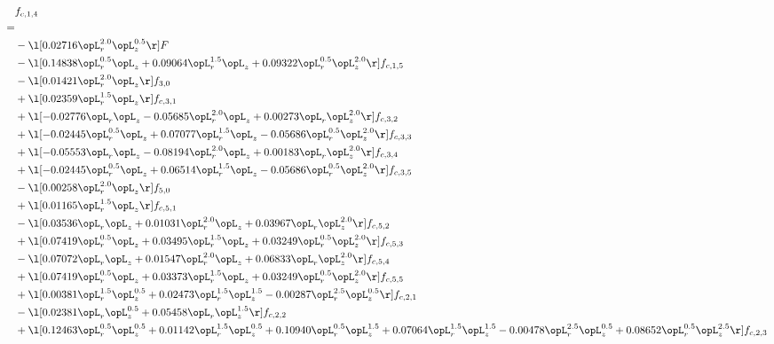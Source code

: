 \begin{alignat}{2} 
\label{eq:f_14_2} 
& f_{c,1,4} \nonumber \\ 
 = \\ 
& - \l[  0.02716 \opL_r^{2.0} \opL_z^{0.5}  \r] F \nonumber \\ 
& - \l[  0.14838 \opL_r^{0.5} \opL_z +  0.09064 \opL_r^{1.5} \opL_z +  0.09322 \opL_r^{0.5} \opL_z^{2.0}  \r] f_{c,1,5} \nonumber \\ 
& - \l[  0.01421 \opL_r^{2.0} \opL_z  \r] f_{3,0} \nonumber \\ 
& + \l[  0.02359 \opL_r^{1.5} \opL_z  \r] f_{c,3,1} \nonumber \\ 
& + \l[  -0.02776 \opL_r \opL_z   -0.05685 \opL_r^{2.0} \opL_z +  0.00273 \opL_r \opL_z^{2.0}  \r] f_{c,3,2} \nonumber \\ 
& + \l[  -0.02445 \opL_r^{0.5} \opL_z +  0.07077 \opL_r^{1.5} \opL_z   -0.05686 \opL_r^{0.5} \opL_z^{2.0}  \r] f_{c,3,3} \nonumber \\ 
& + \l[  -0.05553 \opL_r \opL_z   -0.08194 \opL_r^{2.0} \opL_z +  0.00183 \opL_r \opL_z^{2.0}  \r] f_{c,3,4} \nonumber \\ 
& + \l[  -0.02445 \opL_r^{0.5} \opL_z +  0.06514 \opL_r^{1.5} \opL_z   -0.05686 \opL_r^{0.5} \opL_z^{2.0}  \r] f_{c,3,5} \nonumber \\ 
& - \l[  0.00258 \opL_r^{2.0} \opL_z  \r] f_{5,0} \nonumber \\ 
& + \l[  0.01165 \opL_r^{1.5} \opL_z  \r] f_{c,5,1} \nonumber \\ 
& - \l[  0.03536 \opL_r \opL_z +  0.01031 \opL_r^{2.0} \opL_z +  0.03967 \opL_r \opL_z^{2.0}  \r] f_{c,5,2} \nonumber \\ 
& + \l[  0.07419 \opL_r^{0.5} \opL_z +  0.03495 \opL_r^{1.5} \opL_z +  0.03249 \opL_r^{0.5} \opL_z^{2.0}  \r] f_{c,5,3} \nonumber \\ 
& - \l[  0.07072 \opL_r \opL_z +  0.01547 \opL_r^{2.0} \opL_z +  0.06833 \opL_r \opL_z^{2.0}  \r] f_{c,5,4} \nonumber \\ 
& + \l[  0.07419 \opL_r^{0.5} \opL_z +  0.03373 \opL_r^{1.5} \opL_z +  0.03249 \opL_r^{0.5} \opL_z^{2.0}  \r] f_{c,5,5} \nonumber \\ 
& + \l[  0.00381 \opL_r^{1.5} \opL_z^{0.5} +  0.02473 \opL_r^{1.5} \opL_z^{1.5}   -0.00287 \opL_r^{2.5} \opL_z^{0.5}  \r] f_{c,2,1} \nonumber \\ 
& - \l[  0.02381 \opL_r \opL_z^{0.5} +  0.05458 \opL_r \opL_z^{1.5}  \r] f_{c,2,2} \nonumber \\ 
& + \l[  0.12463 \opL_r^{0.5} \opL_z^{0.5} +  0.01142 \opL_r^{1.5} \opL_z^{0.5} +  0.10940 \opL_r^{0.5} \opL_z^{1.5} +  0.07064 \opL_r^{1.5} \opL_z^{1.5}   -0.00478 \opL_r^{2.5} \opL_z^{0.5} +  0.08652 \opL_r^{0.5} \opL_z^{2.5}  \r] f_{c,2,3} \nonumber \\ 

\end{alignat}
